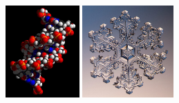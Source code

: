 \documentclass[12pt,a4paper]{article}
\begin{document}
\begin{figure}[h]
\hfill
{}
\hfill
\includegraphics[height=100pt]{images/adn.jpg}
\hfill
\includegraphics[height=100pt]{images/flocon_neige.jpg}


\end{figure}
\end{document}
